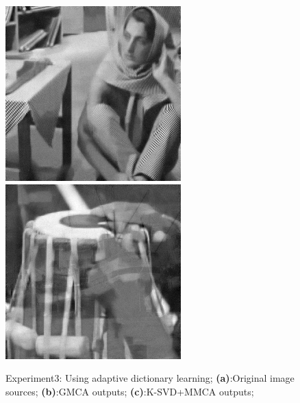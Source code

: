 \begin{figure}
{\begin{minipage}[b]{0.23\linewidth}
\includegraphics[width=1\linewidth]{images/ammca_out3.png}\vspace{4pt}
\includegraphics[width=1\linewidth]{images/ammca_out1.png}
\end{minipage}}
\caption{Experiment3: Using adaptive dictionary learning; \textbf{(a)}:Original image sources; \textbf{(b)}:GMCA outputs; \textbf{(c)}:K-SVD+MMCA outputs;}
\end{figure}